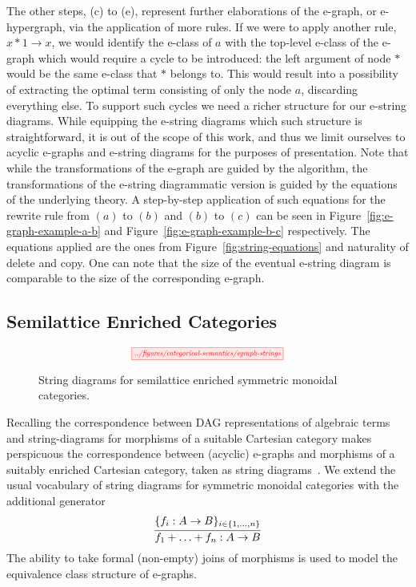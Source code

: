 The other steps, (c) to (e), represent further elaborations of the e-graph, or e-hypergraph, via the application of more rules.
If we were to apply another rule, $x * 1 \to x$, we would identify the e-class of $a$ with the top-level e-class of the e-graph which would require a cycle to be introduced: the left argument of node $*$ would be the same e-class that $*$ belongs to.
This would result into a possibility of extracting the optimal term consisting of only the node $a$, discarding everything else.
To support such cycles we need a richer structure for our e-string diagrams.
While equipping the e-string diagrams which such structure is straightforward, it is out of the scope of this work, and thus we limit ourselves to acyclic e-graphs and e-string diagrams for the purposes of presentation.
Note that while the transformations of the e-graph are guided by the algorithm, the transformations of the e-string diagrammatic version is guided by the equations of the underlying theory.
A step-by-step application of such equations for the rewrite rule from $(a)$ to $(b)$ and $(b)$ to $(c)$ can be seen in Figure~\ref{fig:e-graph-example-a-b} and Figure~\ref{fig:e-graph-example-b-c} respectively.
The equations applied are the ones from Figure~\ref{fig:string-equations} and naturality of delete and copy.
One can note that the size of the eventual e-string diagram is comparable to the size of the corresponding e-graph.

\subsection{Semilattice Enriched Categories}

\begin{figure}
\[
	\scalebox{0.65}{
	\tikzfig{../figures/categorical-semantics/egraph-strings}
	}
\]
\captionsetup{belowskip=-4ex}
\caption{String diagrams for semilattice enriched symmetric monoidal categories.}
\label{fig:egraph-strings}
\end{figure}

Recalling the correspondence between DAG representations of algebraic terms and  string-diagrams for morphisms of a suitable Cartesian category
makes perspicuous the correspondence between (acyclic) e-graphs and morphisms of a suitably enriched Cartesian category, taken as string diagrams~\cite{Selinger_2010,joyal_geometry_1991, mellies_functorial_2006}. We extend the usual vocabulary of string diagrams for symmetric monoidal categories with the additional generator
\[
\infer{f_1 + \ldots + f_n: A \to B}{\{f_i: A \to B\}_{i \in \{1,\ldots,n\}}}
\]
The ability to take formal (non-empty) joins of morphisms is used to model the equivalence class structure of e-graphs.

